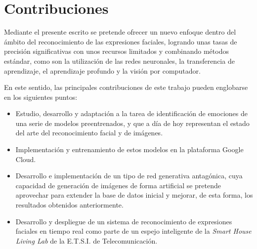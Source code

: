 \section{Contribuciones}

Mediante el presente escrito se pretende ofrecer un nuevo enfoque dentro del ámbito del reconocimiento de las expresiones faciales, logrando unas tasas de precisión significativas con unos recursos limitados y combinando métodos estándar, como son la utilización de las redes neuronales, la transferencia de aprendizaje, el aprendizaje profundo y la visión por computador.
 
En este sentido, las principales contribuciones de este trabajo pueden englobarse en los siguientes puntos:
\begin{itemize}
  \item Estudio, desarrollo y adaptación a la tarea de identificación de emociones de una serie de modelos preentrenados, y que a día de hoy representan el estado del arte del reconocimiento facial y de imágenes.
  \item Implementación y entrenamiento de estos modelos en la plataforma Google Cloud.
  \item Desarrollo e implementación de un tipo de red generativa antagónica, cuya capacidad de generación de imágenes de forma artificial se pretende aprovechar para extender la base de datos inicial y mejorar, de esta forma, los resultados obtenidos anteriormente.
  \item Desarrollo y despliegue de un sistema de reconocimiento de expresiones faciales en tiempo real como parte de un espejo inteligente de la \textit{Smart House Living Lab} de la E.T.S.I. de Telecomunicación.
\end{itemize}